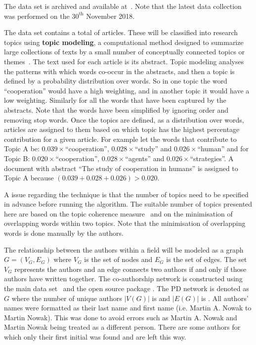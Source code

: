 \documentclass{article}
\theoremstyle{definition}
\newcommand{\totalarticles}{}
\newcommand{\authors}{}
\newcommand{\edges}{}
\begin{document}
The data set is archived and available at~\cite{pd_data_2018}. Note that the latest data
collection was performed on the \(30^{\text{th}}\) November 2018.

The data set contains a total of \totalarticles articles. These will be classified
into research topics using \textbf{topic modeling}, a computational method
designed to summarize large collections of texts by a small number of
conceptually connected topics or themes~\cite{Blei2003, Grimmer2013}. The text
used for each article is its abstract. Topic modeling analyses the patterns
with which words co-occur in the abstracts, and then a topic is defined by a
probability distribution over words. So in one topic the word ``cooperation''
would have a high weighting, and in another topic it would have a low weighting.
Similarly for all the words that have been captured by the abstracts. Note that
the words have been simplified by ignoring order and removing stop words.
Once the topics are defined, as a distribution over words, articles are assigned
to them based on which topic has the highest percentage contribution for a given
article. For example let the words that contribute to Topic A be:
\(0.039 \times\)``cooperation'', \(0.028 \times\)``study'' and \(0.026 \times\)``human''
and for Topic B: \(0.020 \times\)``cooperation'', \(0.028 \times\)``agents'' and
\(0.026 \times\)``strategies''. A document with abstract ``The
study of cooperation in humans'' is assigned to Topic A because \((0.039 + 0.028 + 0.026)
> 0.020\).

A issue regarding the technique is that the
number of topics need to be specified in advance before running the algorithm.
The suitable number of topics presented here are based on the topic coherence
measure~\cite{Roder2015} and on the minimisation of overlapping words within two
topics. Note that the minimisation of overlapping words is done manually
by the authors.

The relationship between the authors within a field will be modeled as a graph
\(G = (V_G, E_G)\) where \(V_G\) is the set of nodes and \(E_G\)  is the set of
edges. The set \(V_G\) represents the authors and an edge connects two authors
if and only if those authors have written together. The co-authorship network is
constructed using the main data set~\cite{pd_data_2018} and the open source package
\cite{networkx}. The PD network is denoted as \(G\) where the
number of unique authors \(|V(G)|\) is \authors and \(|E(G)|\) is \edges.
All authors' names were formatted as their last name and first name (i.e.
Martin A. Nowak to Martin Nowak). This was done to avoid errors such as Martin
A. Nowak and Martin Nowak being treated as a different person. There are some
authors for which only their first initial was found and are left this way.
\end{document}
